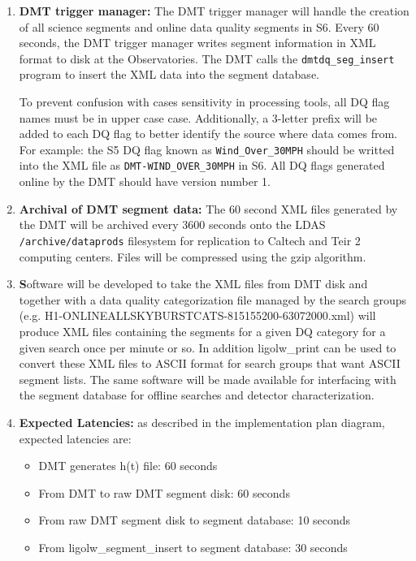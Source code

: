\begin{enumerate}
\item \textbf{DMT trigger manager:} The DMT trigger manager will handle the
creation of all science segments and online data quality segments in S6. Every
60 seconds, the DMT trigger manager writes segment information in XML format
to disk at the Observatories. The DMT calls the \verb|dmtdq_seg_insert|
program to insert the XML data into the segment database.

To prevent confusion with cases sensitivity in processing tools, all DQ flag
names must be in upper case case. Additionally, a 3-letter prefix will be
added to each DQ flag to better identify the source where data comes from. For
example: the S5 DQ flag known as \verb|Wind_Over_30MPH| should be writted
into the XML file as \verb|DMT-WIND_OVER_30MPH| in S6. All DQ flags generated online by the DMT should have version
number 1.

\item \textbf{Archival of DMT segment data:} The 60 second XML files generated
by the DMT will be archived every 3600 seconds onto the LDAS
\verb|/archive/dataprods| filesystem for replication to Caltech and Teir 2
computing centers. Files will be compressed using the gzip algorithm.

\item \textbf Software will be developed to take the XML files from DMT disk
and together with a data quality categorization file managed by the search
groups (e.g. H1-ONLINEALLSKYBURSTCATS-815155200-63072000.xml) will produce XML
files containing the segments for a given DQ category for a given search once
per minute or so. In addition ligolw\_print can be used to convert these XML
files to ASCII format for search groups that want ASCII segment lists. The same
software will be made available for interfacing with the segment database for
offline searches and detector characterization. 

\item \textbf{Expected Latencies:} as described in the implementation plan
diagram, expected latencies are:
\begin{itemize}
\item DMT generates h(t) file: 60 seconds
\item From DMT to raw DMT segment disk: 60 seconds
\item From raw DMT segment disk to segment database: 10 seconds
\item From ligolw\_segment\_insert to segment database: 30 seconds
\end{itemize}
\end{enumerate}




